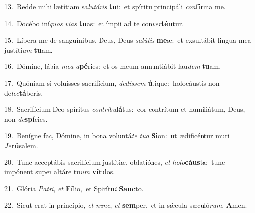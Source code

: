 {\numbfont\textcolor{\numbcolor}{13.}}~Redde mihi lætítiam sa\-\textit{lu}\-\textit{tá}\textit{ris} \textbf{tu}\-i:~\star et spíritu principáli \textit{con}\-\textbf{fír}ma me.\par
{\numbfont\textcolor{\numbcolor}{14.}}~Docébo iní\textit{quos} \textit{vi}\-\textit{as} \textbf{tu}\-as:~\star et ímpii ad te con\-\textit{ver}\-\textbf{tén}tur.\par
{\numbfont\textcolor{\numbcolor}{15.}}~Líbera me de sanguínibus, Deus, Deus \textit{sa}\-\textit{lú}\textit{tis} \textbf{me}\-æ:~\star et exsultábit lingua mea justíti\textit{am} \textbf{tu}\-am.\par
{\numbfont\textcolor{\numbcolor}{16.}}~Dómine, lábia \textit{me}\-\textit{a} \textit{a}\-\textbf{pé}ries:~\star et os meum annuntiábit lau\textit{dem} \textbf{tu}\-am.\par
{\numbfont\textcolor{\numbcolor}{17.}}~Quóniam si voluísses sacrifícium, \textit{de}\-\textit{dís}\textit{sem} \textbf{ú}\-tique:~\star holocáustis non de\-\textit{lec}\-\textbf{tá}beris.\par
{\numbfont\textcolor{\numbcolor}{18.}}~Sacrifícium Deo spíritus \textit{con}\-\textit{tri}\textit{bu}\textbf{lá}tus:~\star cor contrítum et humiliátum, Deus, non \textit{de}\-\textbf{spí}cies.\par
{\numbfont\textcolor{\numbcolor}{19.}}~Benígne fac, Dómine, in bona voluntá\textit{te} \textit{tu}\-\textit{a} \textbf{Si}\-on:~\star ut ædificéntur muri \textit{Je}\-\textbf{rú}salem.\par
{\numbfont\textcolor{\numbcolor}{20.}}~Tunc acceptábis sacrifícium justítiæ, oblatiónes, \textit{et} \textit{ho}\-\textit{lo}\textbf{cáus}ta:~\star tunc impónent super altáre tu\textit{um} \textbf{ví}\-tulos.\par
{\numbfont\textcolor{\numbcolor}{21.}}~Glória \textit{Pa}\-\textit{tri}, \textit{et} \textbf{Fí}\-lio,~\star et Spirítu\textit{i} \textbf{Sanc}\-to.\par
{\numbfont\textcolor{\numbcolor}{22.}}~Sicut erat in princípio, \textit{et} \textit{nunc}\-, \textit{et} \textbf{sem}\-per,~\star et in sǽcula sæculó\-\textit{rum}\-. \textbf{A}\-men.\par
